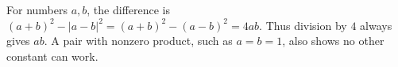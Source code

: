 For numbers $a,b$, the difference is $(a+b)^2-|a-b|^2=(a+b)^2-(a-b)^2=4ab$. Thus division by $\boxed4$ always gives $ab$. A pair with nonzero product, such as $a=b=1$, also shows no other constant can work.
